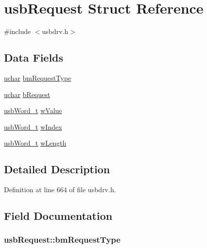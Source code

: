 \hypertarget{structusb_request}{\section{usb\-Request Struct Reference}
\label{structusb_request}
}


{\ttfamily \#include $<$usbdrv.\-h$>$}

\subsection*{Data Fields}
\begin{DoxyCompactItemize}
\item 
\hyperlink{usbdrv_8h_aa8ddf20cdd716b652e76e23e5e700893}{uchar} \hyperlink{structusb_request_a05c2e0d9ac30dce558bcd69a692314c0}{bm\-Request\-Type}
\item 
\hyperlink{usbdrv_8h_aa8ddf20cdd716b652e76e23e5e700893}{uchar} \hyperlink{structusb_request_a34c18b1dd0af60774cac48b176220c2c}{b\-Request}
\item 
\hyperlink{usbdrv_8h_a992d37ca7c2980c180e963d4f78a30ea}{usb\-Word\-\_\-t} \hyperlink{structusb_request_ab3f8687bb757c53ed03c3ce4310dc5c5}{w\-Value}
\item 
\hyperlink{usbdrv_8h_a992d37ca7c2980c180e963d4f78a30ea}{usb\-Word\-\_\-t} \hyperlink{structusb_request_aefa059246bf079d5b42af148a2ad6a95}{w\-Index}
\item 
\hyperlink{usbdrv_8h_a992d37ca7c2980c180e963d4f78a30ea}{usb\-Word\-\_\-t} \hyperlink{structusb_request_a770437881c2e37d1384982fe26d87e7f}{w\-Length}
\end{DoxyCompactItemize}


\subsection{Detailed Description}


Definition at line 664 of file usbdrv.\-h.



\subsection{Field Documentation}
\hypertarget{structusb_request_a05c2e0d9ac30dce558bcd69a692314c0}{
\subsubsection[{bm\-Request\-Type}]{ usb\-Request\-::bm\-Request\-Type}}\label{structusb_request_a05c2e0d9ac30dce558bcd69a692314c0}


